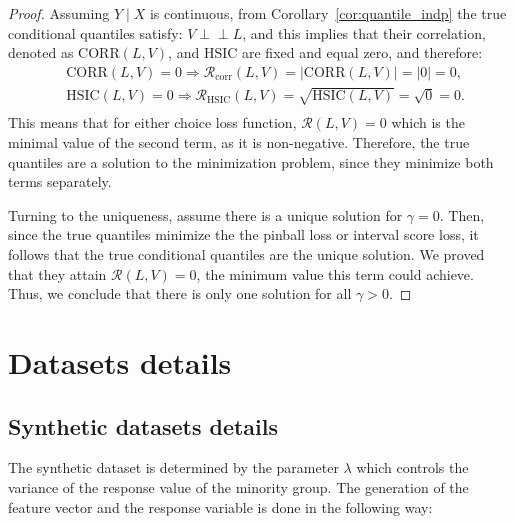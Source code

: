 \documentclass{article}
\newcommand{\indep}{\perp \!\!\! \perp}
\begin{document}
\begin{appendices}
\begin{proof}
Assuming $Y \mid X$ is continuous, from Corollary~\ref{cor:quantile_indp} the true conditional quantiles satisfy: $V \indep L$, and this implies that their correlation, denoted as $\textrm{CORR}(L,V)$, and HSIC are fixed and equal zero, and therefore:
\begin{equation*}
\begin{split}
& \textrm{CORR}(L,V)=0 \Rightarrow \mathcal{R}_{\textrm{corr}}(L,V)= \left| \textrm{CORR}(L,V) \right|= \left| 0 \right|=0,\\ 
& \textrm{HSIC}(L,V)=0 \Rightarrow \mathcal{R}_{\textrm{HSIC}}(L,V)= \sqrt{\textrm{HSIC}(L,V)}= \sqrt{0}=0.\\ 
\end{split}
\end{equation*}
This means that for either choice loss function, $\mathcal{R}(L,V)=0$ which is the minimal value of the second term, as it is non-negative.
Therefore, the true quantiles are a solution to the minimization problem, since they minimize both terms separately.

Turning to the uniqueness, assume there is a unique solution for $\gamma=0$. Then, since the true quantiles minimize the the pinball loss or interval score loss, it follows that the true conditional quantiles are the unique solution. We proved that they attain $\mathcal{R}(L,V)=0$, the minimum value this term could achieve. Thus, we conclude that there is only one solution for all $\gamma>0$.
\end{proof}



\section{Datasets details}

\subsection{Synthetic datasets details}\label{syn_dataset_details}

The synthetic dataset is determined by the parameter $\lambda$ which controls the variance of the response value of the minority group. The generation of the feature vector and the response variable is done in the following way:


\end{appendices}
\end{document}
